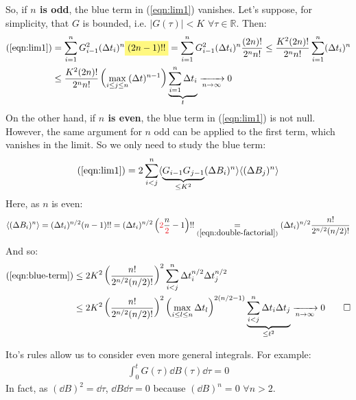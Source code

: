 \documentclass[../template.tex]{subfiles}
\begin{document}
\begin{example}
    So, if \textbf{$n$ is odd}, the blue term in (\ref{eqn:lim1}) vanishes. Let's suppose, for simplicity, that $G$ is bounded, i.e. $|G(\tau)| < K$ $\forall \tau \in \mathbb{R}$. Then:
    \begin{align*}
        (\ref{eqn:lim1}) &= \sum_{i=1}^n G_{i-1}^2 (\Delta t_i)^n \hlc{Yellow}{(2n-1)!! }=
        \sum_{i=1}^n  G_{i-1}^2  (\Delta t_i)^n \frac{(2n)!}{2^n n!} \leq \frac{K^2(2n)!}{2^n n!} \sum_{i=1}^n (\Delta t_i)^n\\
        &\leq \frac{K^2 (2n)!}{2^n n!} \left(\max_{i \leq j \leq n} (\Delta t)^{n-1} \right)\underbrace{\sum_{i=1}^n \Delta t_i}_{t}  \xrightarrow[n \to \infty]{}  0
    \end{align*}  
    On the other hand, if \textbf{$n$ is even}, the blue term in (\ref{eqn:lim1}) is not null. However, the same argument for $n$ odd can be applied to the first term, which vanishes in the limit. So we only need to study the blue term:
    \begin{align}
        (\ref{eqn:lim1}) = 2 \sum_{i< j}^n  \langle \underbrace{G_{i-1} G_{j-1}}_{\leq K^2}  (\Delta B_i)^n \rangle \langle (\Delta B_j)^n \rangle \label{eqn:blue-term}
    \end{align}
    Here, as $n$ is even:
    \begin{align*}
        \langle (\Delta B_i)^n \rangle = (\Delta t_i)^{n/2} (n-1)!! = (\Delta t_i)^{n/2} \left(\textcolor{Red}{2}\frac{n}{\textcolor{Red}{2}} - 1 \right)!! \underset{(\ref{eqn:double-factorial})}{=} (\Delta t_i)^{n/2} \frac{n!}{2^{n/2} (n/2)!} 
    \end{align*}
    And so:
    \begin{align*}
        (\ref{eqn:blue-term}) &\leq 2K^2 \left(\frac{n!}{2^{n/2}(n/2)!} \right)^2 \sum_{i< j}^n \Delta t_i^{n/2} \Delta t_j^{n/2} \\ &\leq 2K^2 \left(\frac{n!}{2^{n/2} (n/2)!} \right)^2 \left(\max_{i \leq l \leq n} \Delta t_l\right)^{2(n/2-1)}  \underbrace{\sum_{i< j}^n \Delta t_i \Delta t_j}_{\leq t^2}  \xrightarrow[n \to \infty]{}  0 \qquad \square
    \end{align*}  
\end{example}

\begin{example}
    Ito's rules allow us to consider even more general integrals. For example:
    \begin{align*}
        \int_0^t G(\tau) \dd{B(\tau)} \dd{\tau} = 0
    \end{align*}
    In fact, as $(\dd{B})^2 = \dd{\tau}$, $\dd{B}\dd{\tau} = 0$ because $(\dd{B})^n = 0$ $\forall n > 2$.  
\end{example}
\end{document}
